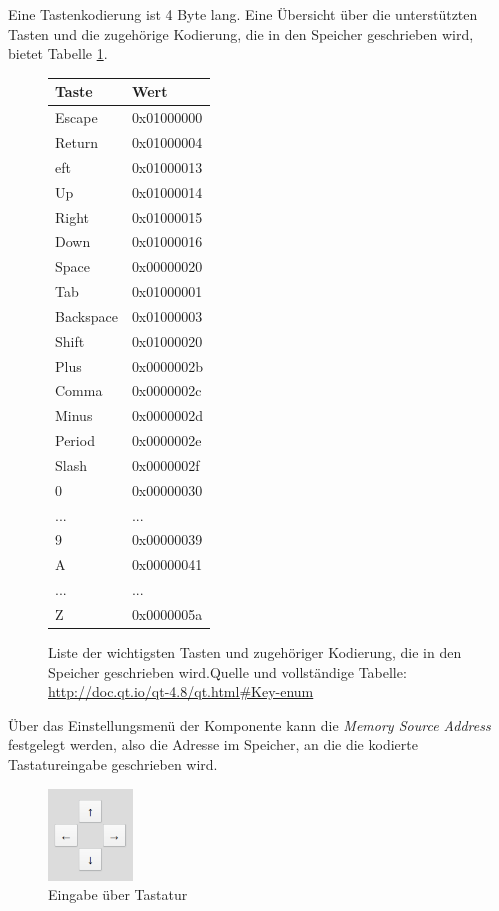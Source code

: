Eine Tastenkodierung ist 4 Byte lang. Eine Übersicht über die unterstützten
Tasten und die zugehörige Kodierung, die in den Speicher geschrieben wird, bietet
Tabelle \ref{tab:keys}.

\begin{figure}
	\centering
	\begin{tabular}{ll}
	\textbf{Taste} & \textbf{Wert} \\
	\hline
	Escape & 0x01000000 \\
	Return & 0x01000004 \\
	eft & 0x01000013 \\
	Up & 0x01000014 \\
	Right & 0x01000015 \\
	Down & 0x01000016 \\
	Space & 0x00000020 \\
	Tab & 0x01000001 \\
	Backspace & 0x01000003 \\
	Shift & 0x01000020 \\
	Plus & 0x0000002b \\
	Comma & 0x0000002c \\
	Minus & 0x0000002d \\
	Period & 0x0000002e \\
	Slash & 0x0000002f \\
	0 & 0x00000030 \\
	... & ... \\
	9 & 0x00000039 \\
	A & 0x00000041 \\
	... & ... \\
	Z & 0x0000005a \\
\end{tabular}
	\caption{Liste der wichtigsten Tasten und zugehöriger Kodierung, die in den
	Speicher geschrieben wird.\newline Quelle und vollständige Tabelle:
	\url{http://doc.qt.io/qt-4.8/qt.html\#Key-enum}}
	\label{tab:keys}
\end{figure}

Über das Einstellungsmenü der Komponente kann die \textit{Memory Source Address}
festgelegt werden, also die Adresse im Speicher, an die die kodierte
Tastatureingabe geschrieben wird.

\begin{figure}[ht]
	\centering
	\includegraphics[width=0.2\textwidth]{Images/Joystick}
	\caption{Eingabe über Tastatur}
	\label{Joystick}
\end{figure}


